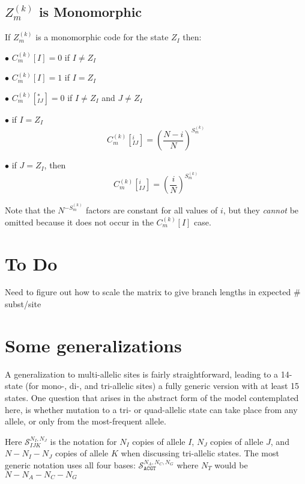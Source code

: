 \documentclass{llncs}
\newcommand{\virtPopSize}{\ensuremath{N}}
\newcommand{\triPomoState}[5]{\ensuremath{\mathcal{S}_{#1#2#3}^{#4,#5}}}
\newcommand{\quadPomoState}[3]{\ensuremath{\mathcal{S}_{\texttt{ACGT}}^{#1,#2,#3}}}
\begin{document}
\subsection*{$Z_m^{(k)}$ is Monomorphic}
If $Z_m^{(k)}$ is a monomorphic code for the state $Z_I$ then:
\begin{compactitem}
    \item[$\bullet$] $C_m^{(k)}[I] = 0$ if $I\neq Z_I$
    \item[$\bullet$] $C_m^{(k)}[I] = 1$ if $I = Z_I$
    \item[$\bullet$] $C_m^{(k)}[^{\ast}_{IJ}] = 0$  if $I\neq Z_I$ and $J\neq Z_I$
    \item[$\bullet$] if $I = Z_I$
     $$C_m^{(k)}[^{i}_{IJ}] = \left(\frac{\virtPopSize - i}{\virtPopSize}\right)^{S_m^{(k)}}$$
    \item[$\bullet$] if $J = Z_I$, then
        $$C_m^{(k)}[^{i}_{IJ}] = \left(\frac{i}{\virtPopSize}\right)^{S_m^{(k)}}$$
\end{compactitem}
Note that the $ \virtPopSize^{-S_m^{(k)}}$ factors are constant for all values of $i$, but they 
     {\em cannot} be omitted because it does not occur in the $C_m^{(k)}[I]$ case.

\section{To Do}
\begin{compactitem}
    \item Need to figure out how to scale the matrix to give branch lengths in expected \# subst/site
\end{compactitem}

\section{Some generalizations}
A generalization to multi-allelic sites is fairly straightforward, leading to a 14-state
    (for mono-, di-, and tri-allelic sites) a fully generic version with at least 15 states.
One question that arises in the abstract form of the model contemplated here, is whether mutation
    to a tri- or quad-allelic state can take place from any allele, or only from the most-frequent
    allele.

Here $\triPomoState{I}{J}{K}{N_I}{N_J}$ is the notation for $N_I$ copies of allele $I$, $N_J$ copies
    of allele $J$, and $\virtPopSize-N_I -N_J$ copies of allele $K$ when discussing tri-allelic states.
The most generic notation uses all four bases: $\quadPomoState{N_A}{N_C}{N_G}$ where $N_T$ would be $\virtPopSize-N_A - N_C - N_G$
\end{document}
